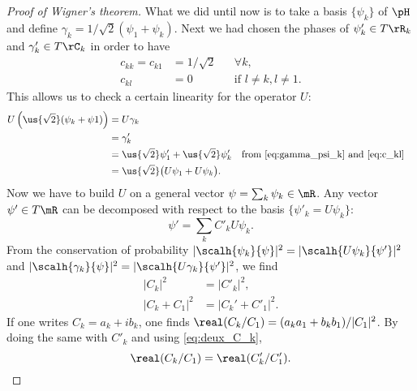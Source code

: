 \begin{proof}[Proof of Wigner's theorem]
	What we  did until now is to take a basis $\{\psi_k\}$ of $\pH$ and define $\gamma_k=1/\sqrt2(\psi_1+\psi_k)$. Next we had chosen the phases of $\psi'_k\in T\rR_k$ and $\gamma'_k\in T\rC_k$ in order to have
	\begin{equation}\label{eq:c_kl}
		\begin{aligned}
			c_{kk}=c_{k1} & =1/\sqrt 2 &  & \forall k,                 \\
			c_{kl}        & =0         &  & \text{if }l\neq k,l\neq 1.
		\end{aligned}
	\end{equation}
	This allows us to check a certain linearity for the operator $U$:
	\begin{equation}
		\begin{aligned}
			U\left( \us{\sqrt 2}(\psi_k+\psi1)  \right)
			 & =U\gamma_k                                                                                                \\
			 & =\gamma'_k                                                                                                \\
			 & =\us{\sqrt 2}\psi'_1+\us{\sqrt 2}\psi'_k      &  & \text{from \eqref{eq:gamma_psi_k} and \eqref{eq:c_kl}} \\
			 & =\us{\sqrt{2}}\big(  U\psi_1+U\psi_k   \big).
		\end{aligned}
	\end{equation}
	Now we have to build $U$ on a general vector $\psi=\sum_k\psi_k\in\mR$. Any vector $\psi'\in T\mR$ can be decomposed with respect to the basis $\{\psi'_k=U\psi_k\}$:
	\begin{equation}\label{eq:dev_Upsi}
		\psi'=\sum_k C'_kU\psi_k.
	\end{equation}
	From the conservation of probability $|\scalh{\psi_k}{\psi}|^2=|\scalh{U\psi_k}{\psi'}|^2$ and $|\scalh{\gamma_k}{\psi}|^2=|\scalh{U\gamma_k}{\psi'}|^2$, we find
	\begin{subequations}\label{eq:deux_C_k}
		\begin{align}
			|C_k|^2     & =|C'_k|^2, \label{eq:deux_C_k_a} \\
			|C_k+C_1|^2 & =|C_k'+C'_1|^2.
		\end{align}
	\end{subequations}
	If one writes $C_k=a_k+ib_k$, one finds $\real(C_k/C_1)=(a_ka_1+b_kb_1)/|C_1|^2$. By doing the same with $C'_k$ and using \eqref{eq:deux_C_k},
	\begin{equation}\label{eq:C_k_C_1}
		\real(C_k/C_1)=\real(C'_k/C'_1).

\end{equation}
\end{proof}
